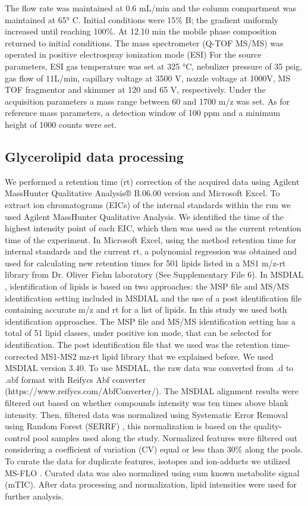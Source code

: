 \documentclass[9pt,twocolumn,twoside,lineno]{BioRxiv}
\begin{document}
The flow rate was maintained at 0.6 mL/min and the column compartment was maintained at 65° C. Initial conditions were 15\% B; the gradient uniformly increased until reaching 100\%. 
At 12.10 min the mobile phase composition returned to initial conditions.
The mass spectrometer (Q-TOF MS/MS) was operated in positive electrospray ionization mode (ESI)
For the source parameters, ESI gas temperature was set at 325 °C, nebulizer pressure of 35 psig, gas flow of 11L/min, capillary voltage at 3500 V, nozzle voltage at 1000V, MS TOF fragmentor and skimmer at 120 and 65 V, respectively.
Under the acquisition parameters a mass range between 60 and 1700 m/z was set. As for reference mass parameters, a detection window of 100 ppm and a minimum height of 1000 counts were set. 

\subsection{Glycerolipid data processing}
We performed a retention time (rt) correction of the acquired data using Agilent MassHunter Qualitative Analysis® B.06.00 version and Microsoft Excel. 
To extract ion chromatograms (EICs) of the internal standards within the run we used Agilent MassHunter Qualitative Analysis.
We identified the time of the highest intensity point of each EIC, which then was used as the current retention time of the experiment. 
In Microsoft Excel, using the method retention time for internal standards and the current rt, a polynomial regression was obtained and used for calculating new retention times for 501 lipids listed in a MS1 m/z-rt library from Dr. Oliver Fiehn laboratory (See Supplementary File 6).
In MSDIAL \cite{Tsugawa2015-kh}, identification of lipids is based on two approaches: the MSP file and MS/MS identification setting included in MSDIAL and the use of a post identification file containing accurate m/z and rt for a list of lipids. In this study we used both identification approaches. 
The MSP file and MS/MS identification setting has a total of 51 lipid classes, under positive ion mode, that can be selected for identification. 
The post identification file that we used was the retention time-corrected MS1-MS2 mz-rt lipid library that we explained before. 
We used MSDIAL \cite{Tsugawa2015-kh} version 3.40. To use MSDIAL, the raw data was converted from .d to .abf format with Reifycs Abf converter (https://www.reifycs.com/AbfConverter/). 
The MSDIAL alignment results were filtered out based on whether compounds intensity was ten times above blank intensity. 
Then, filtered data was normalized using Systematic Error Removal using Random Forest (SERRF) \cite{Fan2019}, this normalization is based on the quality-control pool samples used along the study. Normalized features were filtered out considering a coefficient of variation (CV) equal or less than 30\% along the pools. 
To curate the data for duplicate features, isotopes and ion-adducts we utilized MS-FLO \cite{DeFelice2017-ms}.
Curated data was also normalized using sum known metabolite signal (mTIC). 
After data processing and normalization, lipid intensities were used for further analysis.
\end{document}
